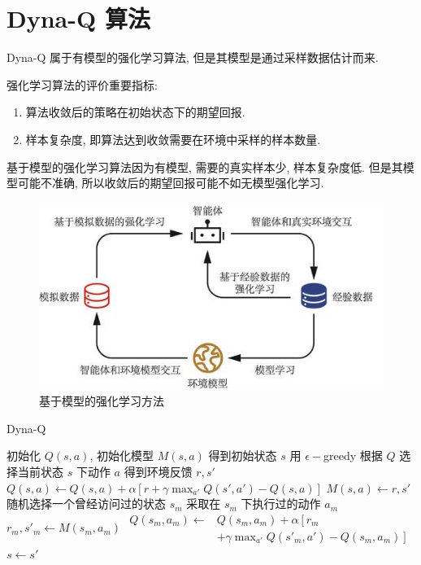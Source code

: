 \newpage
\section{Dyna-Q 算法}


Dyna-Q 属于有模型的强化学习算法, 但是其模型是通过采样数据估计而来. 

强化学习算法的评价重要指标: 
\begin{enumerate}
    \item 算法收敛后的策略在初始状态下的期望回报.
    \item 样本复杂度, 即算法达到收敛需要在环境中采样的样本数量. 
\end{enumerate}
基于模型的强化学习算法因为有模型, 需要的真实样本少, 样本复杂度低. 但是其模型可能不准确, 所以收敛后的期望回报可能不如无模型强化学习. 

\begin{figure}[!htb]
    \centering
    \includegraphics[width=0.88\linewidth]{pic/RL6/基于模型的强化学习方法}
    \caption{基于模型的强化学习方法}
\end{figure}

\begin{algorithm}[htb]
    \caption{Dyna-Q}
    \begin{algorithmic}
        \State 初始化 $Q(s,a)$, 初始化模型 $M(s,a)$
            \State 得到初始状态 $s$
                \State 用 $\epsilon-$greedy 根据 $Q$ 选择当前状态 $s$ 下动作 $a$
                \State 得到环境反馈 $r,s'$
                \State $\displaystyle Q(s, a) \leftarrow Q(s, a) + \alpha \left[ r + \gamma \max_{a'} Q(s', a') - Q(s, a) \right]$
                \State $M(s,a)\leftarrow r,s'$
                    \State 随机选择一个曾经访问过的状态 $s_m$
                    \State 采取在 $s_m$ 下执行过的动作 $a_m$
                    \State $r_m, s'_m \leftarrow M(s_m, a_m)$
                    \State $\begin{aligned}
                         Q(s_m, a_m) \leftarrow & Q(s_m, a_m) + \alpha \left[ r_m \right. \\ & \left.+ \gamma \max_{a'} Q(s'_m, a') - Q(s_m, a_m) \right]
                    \end{aligned}$
                \EndFor
                \State $s\leftarrow s'$
            \EndFor
        \EndFor
    \end{algorithmic}
\end{algorithm}





